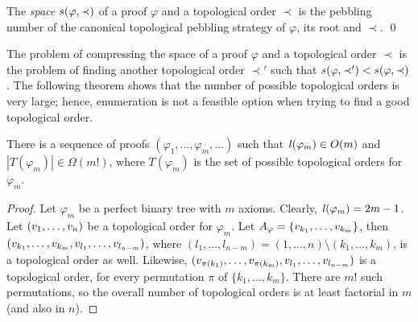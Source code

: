 \begin{definition}[Space]
\label{def:space measure}
The \emph{space} $s(\varphi,\prec)$ 
of a proof $\varphi$ and a topological order $\prec$ is the pebbling number of the canonical topological pebbling strategy of $\varphi$, its root and $\prec$.
\qed
\end{definition}

The problem of compressing the space of a proof $\varphi$ and a topological order $\prec$ is the problem of finding another topological order $\prec'$ such that $s(\varphi,\prec') < s(\varphi,\prec)$. The following theorem shows that the number of possible topological orders is very large; hence, enumeration is not a feasible option when trying to find a good topological order.

\begin{theorem}
\label{theorem:enumeration}
There is a sequence of proofs $(\varphi_1,\ldots,\varphi_m,\ldots)$ such that $\mathit{l}(\varphi_m) \in O(m)$ and $|T(\varphi_m)| \in \Omega(m!)$, where $T(\varphi_m)$ is the set of possible topological orders for $\varphi_m$.
\end{theorem}
\begin{proof}
Let $\varphi_m$ be a perfect binary tree with $m$ axioms. Clearly, $\mathit{l}(\varphi_m) = 2m-1$.
Let $(v_1,\ldots,v_n)$ be a topological order for $\varphi_m$. 
Let $A_{\varphi} = \{v_{k_1},\ldots,v_{k_m}\}$, then $(v_{k_1},\ldots,v_{k_m},v_{l_1},\ldots,v_{l_{n-m}})$, where $(l_1,\ldots,l_{n-m}) = (1,\ldots,n) \setminus (k_1,\ldots,k_m)$, is a topological order as well. 
Likewise, $(v_{\pi({k_1})},\ldots,v_{\pi({k_m})},v_{l_1},\ldots,v_{l_{n-m}})$ is a topological order, for every permutation $\pi$ of $\{k_1,\ldots,k_m\}$. There are $m!$ such permutations, so the overall number of topological orders is at least factorial in $m$ (and also in $n$).
\end{proof}

